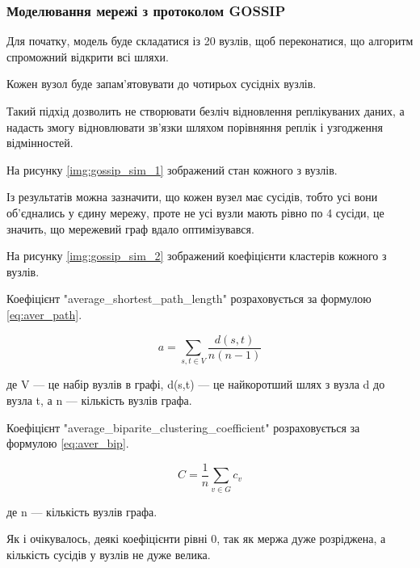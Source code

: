 \documentclass{lib/styles/default-style}
\begin{document}

    \subsubsection{Моделювання мережі з протоколом GOSSIP}

    Для початку, модель буде складатися із 20 вузлів, щоб переконатися, що алгоритм спроможний відкрити всі шляхи.

    Кожен вузол буде запам'ятовувати до чотирьох сусідніх вузлів.

    Такий підхід дозволить не створювати безліч відновлення реплікуваних даних,
    а надасть змогу відновлювати зв'язки шляхом порівняння реплік і узгодження відмінностей.
    
    На рисунку \ref{img:gossip_sim_1} зображений стан кожного з вузлів.


    Із результатів можна зазначити, що кожен вузел має сусідів, тобто усі вони об'єднались у єдину мережу,
    проте не усі вузли мають рівно по 4 сусіди, це значить, що мережевий граф вдало оптимізувався.

    На рисунку \ref{img:gossip_sim_2} зображений коефіцієнти кластерів кожного з вузлів.


    Коефіцієнт "average\_shortest\_path\_length" розраховується за формулою \ref{eq:aver_path}.

    \begin{equation}
        a = \sum_{s, t \in V}\frac{d(s,t)}{n(n-1)}
        \label{eq:aver_path}
    \end{equation}

    де V --- це набір вузлів в графі, d(s,t) --- це найкоротший шлях з вузла d до вузла t, а n --- кількість вузлів графа.

    Коефіцієнт "average\_biparite\_clustering\_coefficient" розраховується за формулою \ref{eq:aver_bip}.

    \begin{equation}
        C = \frac{1}{n}\sum_{v\in G}c_{v}
        \label{eq:aver_bip}
    \end{equation}

    де n --- кількість вузлів графа.

    Як і очікувалось, деякі коефіцієнти рівні 0, так як мержа дуже розріджена, а кількість сусідів у вузлів 
    не дуже велика.
\end{document}
